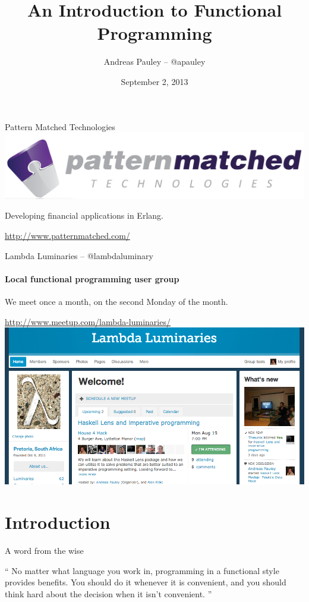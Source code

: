 \documentclass{beamer}
\title[Functional Programming]{An Introduction to Functional Programming}
\author{Andreas Pauley -- @apauley}
\institute{Pattern Matched Technologies\\Lambda Luminaries @lambdaluminary}
\date{September 2, 2013}
\begin{document}

\begin{frame}
  \titlepage
\end{frame}

\begin{frame}{Pattern Matched Technologies}
  \includegraphics[scale=0.21]{img/pmt-logo.png}

  Developing financial applications in Erlang.

  \url{http://www.patternmatched.com/}
\end{frame}

\begin{frame}{Lambda Luminaries -- @lambdaluminary}
  \framesubtitle{Local functional programming user group}
  We meet once a month, on the second Monday of the month.

  \url{http://www.meetup.com/lambda-luminaries/}
  \includegraphics[scale=0.3]{img/LambdaLuminariesScreenShot2013-08-09.png}
\end{frame}

\section{Introduction}

\begin{frame}{A word from the wise}
  \begin{exampleblock}{}
    {\Large ``
      No matter what language you work in, programming
      in a functional style provides benefits.
      You should do it whenever it is convenient, and you
      should think hard about the decision when it isn’t convenient.
      ''}
    \vskip5mm
    \hspace*{}
  \end{exampleblock}
\end{frame}
\end{document}
